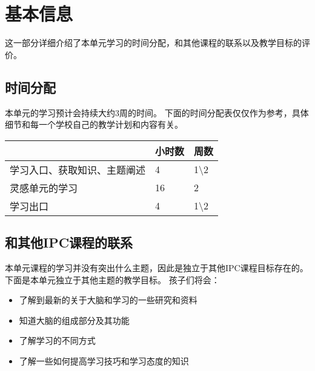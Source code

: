 \chapter{基本信息}
    这一部分详细介绍了本单元学习的时间分配，和其他课程的联系以及教学目标的评价。

\section{时间分配}
    本单元的学习预计会持续大约3周的时间。
    下面的时间分配表仅仅作为参考，具体细节和每一个学校自己的教学计划和内容有关。


\begin{table}[h]     
\begin{tabular}{l|l|l}
\hline
\colorbox[gray]{0.95}{ & 小时数 & 周数 } \\
\hline
学习入口、获取知识、主题阐述 &  4 & 1\textbackslash2 \\
灵感单元的学习  & 16  &   2  \\
学习出口  & 4  &  1\textbackslash2 \\
\hline
\end{tabular}
\end{table}



\section{和其他IPC课程的联系}
    本单元课程的学习并没有突出什么主题，因此是独立于其他IPC课程目标存在的。下面是本单元独立于其他主题的教学目标。
    孩子们将会：
    \begin{itemize}
      \item 了解到最新的关于大脑和学习的一些研究和资料 
      \item 知道大脑的组成部分及其功能
      \item 了解学习的不同方式  
      \item 了解一些如何提高学习技巧和学习态度的知识
    \end{itemize}


